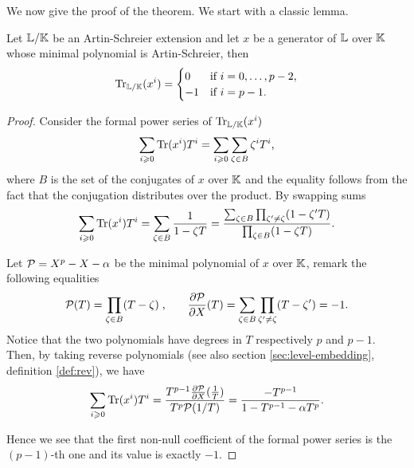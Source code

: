 We now give the proof of the theorem. We start with a classic lemma.

\begin{lemma}
  \label{Lemma:trace-AS}
  Let $\mathbb{L}/\mathbb{K}$ be an Artin-Schreier extension and let $x$ be a
  generator of $\mathbb{L}$ over $\mathbb{K}$ whose minimal polynomial is
  Artin-Schreier, then
  \begin{equation*}
    \operatorname{Tr}_{\mathbb{L}/\mathbb{K}}(x^i) = \begin{cases}
      0  & \text{if $i=0,\ldots,p-2$,}\\
      -1 & \text{if $i=p-1$.}
    \end{cases}
  \end{equation*}
\end{lemma}
\begin{proof}
  Consider the formal power series of $\operatorname{Tr}_{\mathbb{L}/\mathbb{K}}(x^i)$
  \begin{equation*}
    \sum_{i\geqslant0}\operatorname{Tr}(x^i)T^i = \sum_{i\geqslant0}\sum_{\zeta\in B}\zeta^iT^i
    \text{,}
  \end{equation*}
  where $B$ is the set of the conjugates of $x$ over $\mathbb{K}$ and the
  equality follows from the fact that the conjugation distributes over
  the product. By swapping sums
  \begin{equation*}
    \sum_{i\geqslant0}\operatorname{Tr}(x^i)T^i = \sum_{\zeta\in B}\frac{1}{1-\zeta T} =
    \frac{\sum_{\zeta\in B}\prod_{\zeta'\ne\zeta}(1-\zeta'T)}
         {\prod_{\zeta\in B}(1-\zeta T)} \text{.}
  \end{equation*}
  
  Let $\mathcal{P} = X^p-X-\alpha$ be the minimal polynomial of $x$ over
  $\mathbb{K}$, remark the following equalities
  \begin{equation*}
    \mathcal{P}(T) = \prod_{\zeta\in B}(T-\zeta) \;\text{,} \qquad
    \frac{\partial\mathcal{P}}{\partial X}(T) =
    \sum_{\zeta\in B}\prod_{\zeta'\ne\zeta}(T-\zeta') = -1\text{.}
  \end{equation*}
  Notice that the two polynomials have degrees in $T$ respectively $p$
  and $p-1$. Then, by taking reverse polynomials (see also section
  \ref{sec:level-embedding}, definition \ref{def:rev}), we have
  \begin{equation*}
    \sum_{i\geqslant0}\operatorname{Tr}(x^i)T^i =
    \frac{T^{p-1}\frac{\partial\mathcal{P}}{\partial X}(\frac{1}{T})}
      {T^p\mathcal{P}(1/T)} = \frac{-T^{p-1}}{1 - T^{p-1} - \alpha T^p}
      \text{.}
  \end{equation*}
  
  Hence we see that the first non-null coefficient of the formal power
  series is the $(p-1)$-th one and its value is exactly $-1$.
\end{proof}

